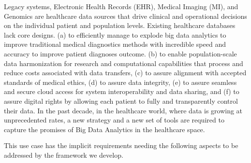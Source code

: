 Legacy systems, Electronic Health Records (EHR), Medical Imaging (MI), and Genomics are healthcare data sources that drive clinical and operational decisions on the individual patient and population levels. 
Existing healthcare databases lack core designs. 
(a) to efficiently manage to explode big data analytics to improve traditional medical diagnostics methods with incredible speed and accuracy to improve patient diagnoses outcome.
(b) to enable population-scale data harmonization for research and computational capabilities that process and reduce costs associated with data transfers, 
(c) to assure alignment with accepted standards of medical ethics, 
(d) to assure data integrity, 
(e) to assure seamless and secure cloud access for system interoperability and data sharing, and 
(f) to assure digital rights by allowing each patient to fully and transparently control their data. 
In the past decade, in the healthcare world, where data is growing at unprecedented rates, a new strategy and a new set of tools are required to capture the promises of Big Data Analytics in the healthcare space. 




This use case has the implicit requirements needing the following
aspects to be addressed by the framework we develop.

